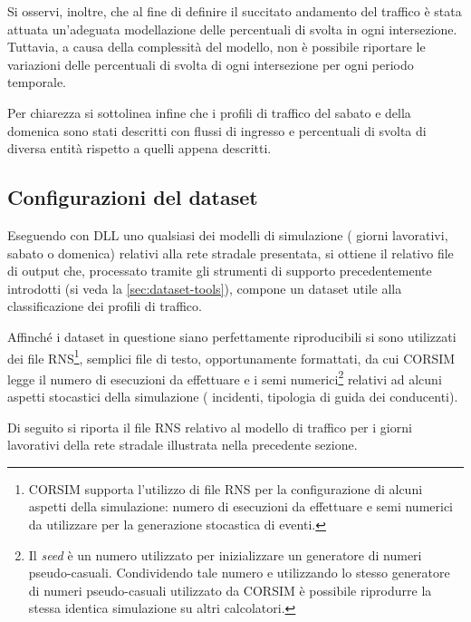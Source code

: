 Si osservi, inoltre, che al fine di definire il succitato andamento del traffico è stata attuata un'adeguata modellazione delle percentuali di svolta in ogni intersezione. Tuttavia, a causa della complessità del modello, non è possibile riportare le variazioni delle percentuali di svolta di ogni intersezione per ogni periodo temporale.

Per chiarezza si sottolinea infine che i profili di traffico del sabato e della domenica sono stati descritti con flussi di ingresso e percentuali di svolta di diversa entità rispetto a quelli appena descritti.

\subsection{Configurazioni del dataset}\label{subsec:config-ds-2}
Eseguendo con  \acs{DLL} uno qualsiasi dei modelli di simulazione (\ie{} giorni lavorativi, sabato o domenica) relativi alla rete stradale presentata, si ottiene il relativo file di output che, processato tramite gli strumenti di supporto precedentemente introdotti (si veda la \vref{sec:dataset-tools}), compone un dataset utile alla classificazione dei profili di traffico.

Affinché i dataset in questione siano perfettamente riproducibili si sono utilizzati dei file \acs{RNS}\footnote{\acs{CORSIM} supporta l'utilizzo di file \acf{RNS} per la configurazione di alcuni aspetti della simulazione: numero di esecuzioni da effettuare e semi numerici da utilizzare per la generazione stocastica di eventi.}, semplici file di testo, opportunamente formattati, da cui \acs{CORSIM} legge il numero di esecuzioni da effettuare e i semi numerici\footnote{Il \emph{seed} è un numero utilizzato per inizializzare un generatore di numeri pseudo-casuali. Condividendo tale numero e utilizzando lo stesso generatore di numeri pseudo-casuali utilizzato da \acs{CORSIM} è possibile riprodurre la stessa identica simulazione su altri calcolatori.} relativi ad alcuni aspetti stocastici della simulazione (\eg{} incidenti, tipologia di guida dei conducenti).

Di seguito si riporta il file \acs{RNS} relativo al modello di traffico per i giorni lavorativi della rete stradale illustrata nella precedente sezione.

